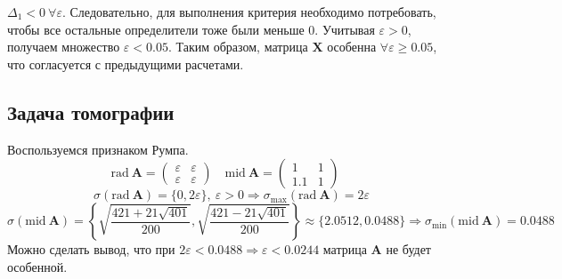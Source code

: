 \documentclass[a4paper]{article}
\begin{document}
$\Delta_1<0\:\forall\varepsilon$. Следовательно, для выполнения критерия необходимо потребовать, чтобы все остальные определители тоже были меньше 0. Учитывая $\varepsilon>0$, получаем множество $\varepsilon<0.05$. Таким образом, матрица $\mathbf{X}$ особенна $\forall\varepsilon\geq0.05$, что согласуется с предыдущими расчетами.
\subsection{Задача томографии}
Воспользуемся признаком Румпа. 
\begin{equation*}
    \mathrm{rad}\:\mathbf{A}=\begin{pmatrix}
    \varepsilon&\varepsilon\\
    \varepsilon&\varepsilon
    \end{pmatrix}\quad
    \mathrm{mid}\:\mathbf{A}=\begin{pmatrix}
    1&1\\
    1.1&1
    \end{pmatrix}\quad
\end{equation*}
\begin{equation*}
    \sigma(\mathrm{rad}\:\mathbf{A})=\{0,2\varepsilon\},\:\varepsilon>0\Rightarrow\sigma_{\mathrm{max}}(\mathrm{rad}\:\mathbf{A})=2\varepsilon
\end{equation*}
\begin{equation*}
    \sigma(\mathrm{mid}\:\mathbf{A})=\left\{\sqrt{\frac{421+21\sqrt{401}}{200}},\sqrt{\frac{421-21\sqrt{401}}{200}}\right\}\approx\{2.0512, 0.0488\}\Rightarrow\sigma_{\mathrm{min}}(\mathrm{mid}\:\mathbf{A})=0.0488
\end{equation*}
Можно сделать вывод, что при $2\varepsilon<0.0488\Rightarrow\varepsilon<0.0244$ матрица $\mathbf{A}$ не будет особенной.
\end{document}
